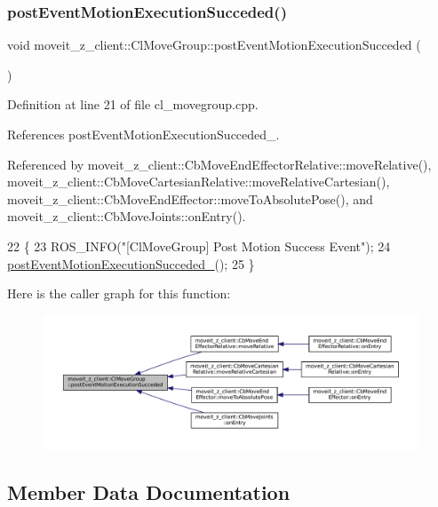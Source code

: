\subsubsection{\texorpdfstring{post\+Event\+Motion\+Execution\+Succeded()}{postEventMotionExecutionSucceded()}}
{\footnotesize\ttfamily void moveit\+\_\+z\+\_\+client\+::\+Cl\+Move\+Group\+::post\+Event\+Motion\+Execution\+Succeded (\begin{DoxyParamCaption}{ }\end{DoxyParamCaption})}



Definition at line 21 of file cl\+\_\+movegroup.\+cpp.



References post\+Event\+Motion\+Execution\+Succeded\+\_\+.



Referenced by moveit\+\_\+z\+\_\+client\+::\+Cb\+Move\+End\+Effector\+Relative\+::move\+Relative(), moveit\+\_\+z\+\_\+client\+::\+Cb\+Move\+Cartesian\+Relative\+::move\+Relative\+Cartesian(), moveit\+\_\+z\+\_\+client\+::\+Cb\+Move\+End\+Effector\+::move\+To\+Absolute\+Pose(), and moveit\+\_\+z\+\_\+client\+::\+Cb\+Move\+Joints\+::on\+Entry().


\begin{DoxyCode}
22 \{
23     ROS\_INFO(\textcolor{stringliteral}{"[ClMoveGroup] Post Motion Success Event"});
24     \hyperlink{classmoveit__z__client_1_1ClMoveGroup_a9234c0edadb1f173c31fc8fa5430afcd}{postEventMotionExecutionSucceded\_}();
25 \}
\end{DoxyCode}
Here is the caller graph for this function\+:
\nopagebreak
\begin{figure}[H]
\begin{center}
\leavevmode
\includegraphics[width=350pt]{classmoveit__z__client_1_1ClMoveGroup_ad6b8f0acbe3d11b5c39a83911a3d95b8_icgraph}
\end{center}
\end{figure}


\subsection{Member Data Documentation}
\mbox{\label{classmoveit__z__client_1_1ClMoveGroup_af86e046b837be0ef4afa9893d8808f20}} 
